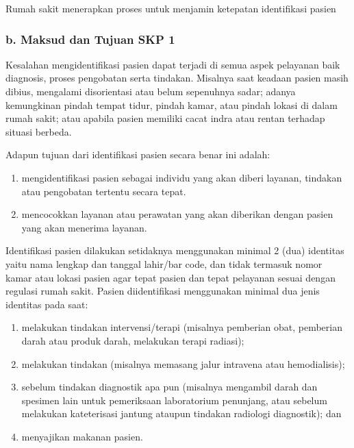 \documentclass[
]{book}
\providecommand{\tightlist}{%
  \setlength{\itemsep}{0pt}\setlength{\parskip}{0pt}}
\begin{document}
Rumah sakit menerapkan proses untuk menjamin ketepatan identifikasi pasien

\hypertarget{b.-maksud-dan-tujuan-skp-1}{%
\subsubsection*{b. Maksud dan Tujuan SKP 1}\label{b.-maksud-dan-tujuan-skp-1}}

Kesalahan mengidentifikasi pasien dapat terjadi di semua aspek pelayanan baik diagnosis, proses pengobatan serta tindakan. Misalnya saat keadaan pasien masih dibius, mengalami disorientasi atau belum sepenuhnya sadar; adanya kemungkinan pindah tempat tidur, pindah kamar, atau pindah lokasi di dalam rumah sakit; atau apabila pasien memiliki cacat indra atau rentan terhadap situasi berbeda.

Adapun tujuan dari identifikasi pasien secara benar ini adalah:

\begin{enumerate}
\def\labelenumi{\arabic{enumi}.}
\tightlist
\item
  mengidentifikasi pasien sebagai individu yang akan diberi layanan, tindakan atau pengobatan tertentu secara tepat.
\item
  mencocokkan layanan atau perawatan yang akan diberikan dengan pasien yang akan menerima layanan.
\end{enumerate}

Identifikasi pasien dilakukan setidaknya menggunakan minimal 2 (dua) identitas yaitu nama lengkap dan tanggal lahir/bar code, dan tidak termasuk nomor kamar atau lokasi pasien agar tepat pasien dan tepat pelayanan sesuai dengan regulasi rumah sakit. Pasien diidentifikasi menggunakan minimal dua jenis identitas pada saat:

\begin{enumerate}
\def\labelenumi{\arabic{enumi}.}
\tightlist
\item
  melakukan tindakan intervensi/terapi (misalnya pemberian obat, pemberian darah atau produk darah, melakukan terapi radiasi);
\item
  melakukan tindakan (misalnya memasang jalur intravena atau hemodialisis);
\item
  sebelum tindakan diagnostik apa pun (misalnya mengambil darah dan spesimen lain untuk pemeriksaan laboratorium penunjang, atau sebelum melakukan kateterisasi jantung ataupun tindakan radiologi diagnostik); dan
\item
  menyajikan makanan pasien.
\end{enumerate}
\end{document}
